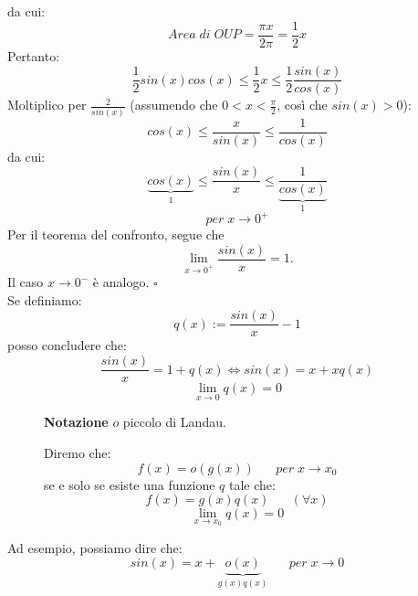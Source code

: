 \documentclass[a4paper]{article}
\theoremstyle{break}
\theoremstyle{break}
\theoremstyle{break}
\theoremstyle{break}
\begin{document}
da cui:
\[
	Area\; di\; OUP = \frac{\pi x}{2 \pi} = \frac{1}{2}x
\]
Pertanto:
\[
	\frac{1}{2}sin(x)cos(x) \le \frac{1}{2}x \le \frac{1}{2} \frac{sin(x)}{cos(x)}
\]
Moltiplico per \( \frac{2}{sin(x)} \) (assumendo che \( 0 < x < \frac{\pi}{2} \), così che \( sin(x) > 0 \)):
\[
	cos(x) \le \frac{x}{sin(x)} \le \frac{1}{cos(x)}
\]
da cui:
\[
	\underbrace{cos(x)}_{1} \le \frac{sin(x)}{x} \le \underbrace{\frac{1}{cos(x)}}_{1}
\]
\[
	per\; x \to  0^+
\]
Per il teorema del confronto, segue che
\[
	\lim_{x \to 0^+} \frac{sin(x)}{x} = 1.
\]
Il caso \( x \to 0^- \) è analogo. \( \square \)
\vspace{1cm}\\
Se definiamo:
\[
	q(x):=\frac{sin(x)}{x}-1
\]
posso concludere che:
\[
	\frac{sin(x)}{x}=1 + q(x) \Leftrightarrow sin(x)=x+xq(x)
\]
\[
	\lim_{x \to 0} q(x) = 0
\]
\begin{figure}[H]
	\begin{definition}
		\textbf{Notazione} \( o \) piccolo di Landau.

		Diremo che:
		\[
			f(x) = o(g(x))\;\;\;\;\;\; per\; x \to x_0
		\]
		se e solo se esiste una funzione \( q \) tale che:
		\[
			f(x) = g(x)q(x)\;\;\;\;\;\; (\forall x)
		\]
		\[
			\lim_{x \to x_0} q(x) = 0
		\]
	\end{definition}
\end{figure}
Ad esempio, possiamo dire che:
\[
	sin(x) = x + \underbrace{o(x)}_{g(x) q(x)}\;\;\;\;\;\; per\; x \to 0
\]
\end{document}
